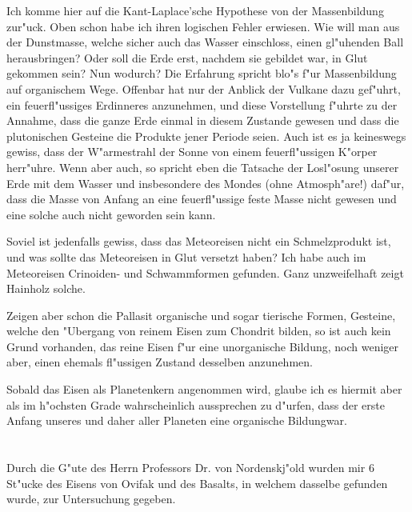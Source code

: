 \documentclass[a4paper, 11pt, oneside]{article}
\begin{document}
Ich komme hier auf die Kant-Laplace'sche Hypothese von der Massenbildung zur"uck. Oben schon habe ich ihren logischen Fehler erwiesen. Wie will man aus der Dunstmasse, welche sicher auch das Wasser einschloss, einen gl"uhenden Ball herausbringen? Oder soll die Erde erst, nachdem sie gebildet war, in Glut gekommen sein? Nun wodurch? Die Erfahrung spricht blo"s f"ur Massenbildung auf organischem Wege. Offenbar hat nur der Anblick der Vulkane dazu gef"uhrt, ein feuerfl"ussiges Erdinneres anzunehmen, und diese Vorstellung f"uhrte zu der Annahme, dass die ganze Erde einmal in diesem Zustande gewesen und dass die plutonischen Gesteine die Produkte jener Periode seien. Auch ist es ja keineswegs gewiss, dass der W"armestrahl der Sonne von einem feuerfl"ussigen K"orper herr"uhre. Wenn aber auch, so spricht eben die Tatsache der Losl"osung unserer Erde mit dem Wasser und insbesondere des Mondes (ohne Atmosph"are!) daf"ur, dass die Masse von Anfang an eine feuerfl"ussige feste Masse nicht gewesen und eine solche auch nicht geworden sein kann.

Soviel ist jedenfalls gewiss, dass das Meteoreisen nicht ein Schmelzprodukt ist, und was sollte das Meteoreisen in Glut versetzt haben? Ich habe auch im Meteoreisen Crinoiden- und Schwammformen gefunden. Ganz unzweifelhaft zeigt Hainholz solche.

Zeigen aber schon die Pallasit organische und sogar tierische Formen, Gesteine, welche den "Ubergang von reinem Eisen zum Chondrit bilden, so ist auch kein Grund vorhanden, das reine Eisen f"ur eine unorganische Bildung, noch weniger aber, einen ehemals fl"ussigen Zustand desselben anzunehmen.

Sobald das Eisen als Planetenkern angenommen wird, glaube ich es hiermit aber als im h"ochsten Grade wahrscheinlich aussprechen zu d"urfen, dass der erste Anfang unseres und daher aller Planeten eine organische Bildungwar.
\clearpage
\section{}
\paragraph{}
Durch die G"ute des Herrn Professors Dr. von Nordenskj"old wurden mir 6 St"ucke des Eisens von Ovifak und des Basalts, in welchem dasselbe gefunden wurde, zur Untersuchung gegeben.
\end{document}
